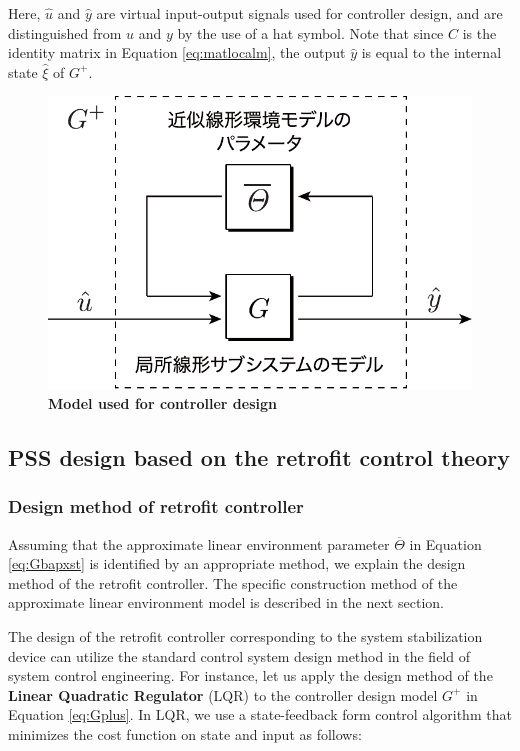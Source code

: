 \documentclass[graybox, envcountchap]{svmult}
\begin{document}
Here, $\hat{u}$ and $\hat{y}$ are virtual input-output signals used for
controller design, and are distinguished from $u$ and $y$ by the use of a hat
symbol. Note that since $C$ is the identity matrix in Equation
\ref{eq:matlocalm}, the output $\hat{y}$ is equal to the internal state
$\hat{\xi}$ of $G^+$.

\begin{figure}[t]
\centering
\includegraphics[width = .50\linewidth]{figs/explocalG2}
\medskip
\caption{\textbf{Model used for controller design}}
\label{fig:explocalG}
\medskip
\end{figure}

\subsection{PSS design based on the retrofit control theory}\label{sec:designret}

\smallskip
\subsubsection{Design method of retrofit controller}

Assuming that the approximate linear environment parameter
$\overline{\mathit{\Theta}}$ in Equation \ref{eq:Gbapxst} is identified by an
appropriate method, we explain the design method of the retrofit controller. The
specific construction method of the approximate linear environment model is
described in the next section.

The design of the retrofit controller corresponding to the system stabilization
device can utilize the standard control system design method in the field of
system control engineering. For instance, let us apply the design method of the
\textbf{Linear Quadratic Regulator} (LQR) 
\cite[Section 5.3]{fairman1998linear} to the controller design model $G^+$ in
Equation \ref{eq:Gplus}. In LQR, we use a state-feedback form control algorithm
that minimizes the cost function on state and input as follows:
\end{document}
